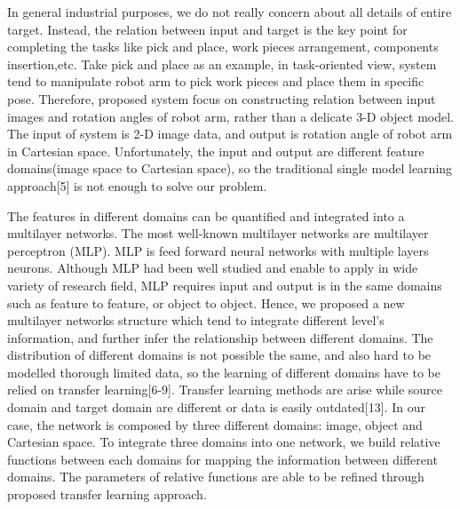 \documentclass[journal]{IEEEtran}
\begin{document}
In general industrial purposes, we do not really concern about all details of entire target. Instead, the relation between input and target is the key point for completing the tasks like pick and place, work pieces arrangement, components insertion,etc. Take pick and place as an example, in task-oriented view, system tend to manipulate robot arm to pick work pieces and place them in specific pose. Therefore, proposed system focus on constructing relation between input images and rotation angles of robot arm, rather than a delicate 3-D object model. The input of system is 2-D image data, and output is rotation angle of robot arm in Cartesian space. Unfortunately, the input and output are different feature domains(image space to Cartesian space), so the traditional single model learning approach[5] is not enough to solve our problem.

The features in different domains can be quantified and integrated into a multilayer networks.  The most well-known multilayer networks are multilayer perceptron (MLP). MLP is feed forward neural networks with multiple layers neurons. Although MLP had been well studied and enable to apply in wide variety of research field, MLP requires input and output is in the same domains such as feature to feature, or object to object. Hence, we proposed a new multilayer networks structure which tend to integrate different level’s information, and further infer the relationship between different domains. The distribution of different domains is not possible the same, and also hard to be modelled thorough limited data, so the learning of different domains have to be relied on transfer learning[6-9]. Transfer learning methods are arise while source domain and target domain are different or data is easily outdated[13]. In our case, the network is composed by three different domains: image, object and Cartesian space. To integrate three domains into one network, we build relative functions between each domains for mapping the information between different domains. The parameters of relative functions are able to be refined through proposed transfer learning approach. 
 
\end{document}

